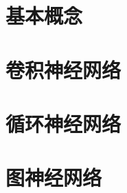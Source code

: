 \documentclass[11pt,oneside]{book}
\begin{document}


\tableofcontents
\chapter{基本概念}









\chapter{卷积神经网络}







\chapter{循环神经网络}






\chapter{图神经网络}


\begin{appendices}
	
\end{appendices}
\end{document}
